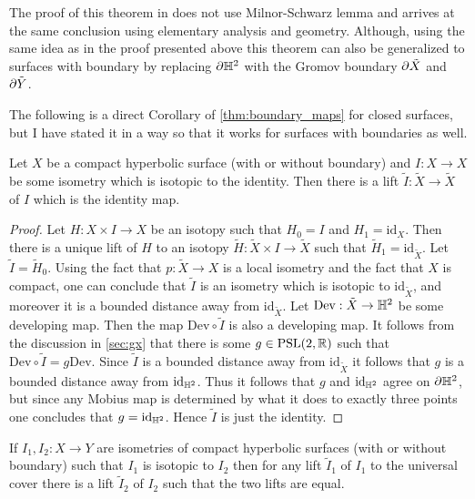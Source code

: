 \begin{rem}
  The proof of this theorem in \cite{casson} does not use Milnor-Schwarz lemma and arrives at the same conclusion using elementary analysis and geometry. Although, using the same idea as in the proof presented above this theorem can also be generalized to surfaces with boundary by replacing $\partial \mathbb{H}^2$ with the Gromov boundary $\partial \tilde{X}$ and $\partial \tilde{Y}$. 
\end{rem}
The following is a direct Corollary of \ref{thm:boundary_maps} for closed surfaces, but I have stated it in a way so that it works for surfaces with boundaries as well. 
\begin{proposition}\label{pro:isometries}
  Let $X$ be a compact hyperbolic surface (with or without boundary) and $I:X\to X$ be some isometry which is isotopic to the identity. Then there is a lift $\tilde{I}:\tilde{X}\to \tilde{X}$ of $I$ which is the identity map.
\end{proposition}
\begin{proof}
  Let $H:X\times I\to X$ be an isotopy such that $H_0 = I$ and $H_1 = \text{id}_X$. Then there is a unique lift of $H$ to an isotopy $\tilde{H}:\tilde{X}\times I \to \tilde{X}$ such that $\tilde{H}_1 = \text{id}_{\tilde{X}}$. Let $\tilde{I} = \tilde{H}_0$. Using the fact that $p:\tilde{X}\to X$ is a local isometry and the fact that $X$ is compact, one can conclude that $\tilde{I}$ is an isometry which is isotopic to $\text{id}_{\tilde{X}}$, and moreover it is a bounded distance away from $\text{id}_{\tilde{X}}$. Let $\text{Dev}:\tilde{X}\to \mathbb{H}^2$ be some developing map. Then the map $\text{Dev}\circ \tilde{I}$ is also a developing map. It follows from the discussion in \ref{sec:gx} that there is some $g\in \text{PSL}(2,\mathbb{R})$ such that $\text{Dev}\circ \tilde{I} = g\text{Dev}$. Since $\tilde{I}$ is a bounded distance away from $\text{id}_{\tilde{X}}$ it follows that $g$ is a bounded distance away from $\text{id}_{\mathbb{H}^2}$. Thus it follows that $g$ and $\text{id}_{\mathbb{H}^2}$ agree on ${\partial \mathbb{H}^2}$, but since any Mobius map is determined by what it does to exactly three points one concludes that $g=\text{id}_{\mathbb{H}^2}$. Hence $\tilde{I}$ is just the identity.
\end{proof}
\begin{cor}
  If $I_1, I_2:X\to Y$ are isometries of compact hyperbolic surfaces (with or without boundary) such that $I_1$ is isotopic to $I_2$ then for any lift $\tilde{I}_1$ of $I_1$ to the universal cover there is a lift $\tilde{I}_2$ of $I_2$ such that the two lifts are equal.
\end{cor}
